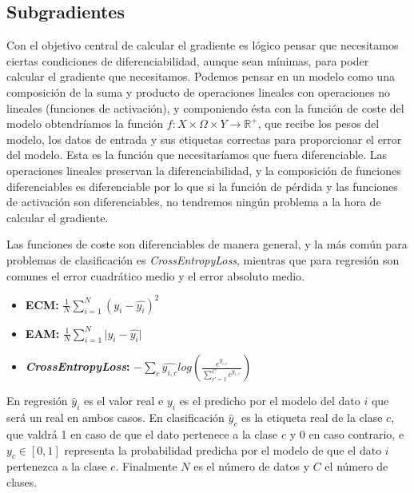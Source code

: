\subsection{Subgradientes} \label{sec:subgrad}

Con el objetivo central de calcular el gradiente es lógico pensar que necesitamos ciertas condiciones de diferenciabilidad, aunque sean mínimas, para poder calcular el gradiente que necesitamos. Podemos pensar en un modelo como una composición de la suma y producto de operaciones lineales con operaciones no lineales (funciones de activación), y componiendo ésta con la función de coste del modelo obtendríamos la función $f: X \times \Omega \times Y \rightarrow \mathbb{R^+}$, que recibe los pesos del modelo, los datos de entrada y sus etiquetas correctas para proporcionar el error del modelo. Esta es la función que necesitaríamos que fuera diferenciable. Las operaciones lineales preservan la diferenciabilidad, y la composición de funciones diferenciables es diferenciable por lo que si la función de pérdida y las funciones de activación son diferenciables, no tendremos ningún problema a la hora de calcular el gradiente.

Las funciones de coste son diferenciables de manera general, y la más común para problemas de clasificación es \textit{CrossEntropyLoss}, mientras que para regresión son comunes el error cuadrático medio y el error absoluto medio.

\begin{itemize}

    \item \textbf{ECM:} $\frac{1}{N} \sum_{i=1}^N \left (y_i - \hat{y_i} \right ) ^2$ 

    \item \textbf{EAM:} $\frac{1}{N} \sum_{i=1}^N \lvert y_i - \hat{y_i} \rvert$ 	

    \item \textbf{\textit{CrossEntropyLoss}:} $  - \sum_c \hat{y_{i,c}} log(\frac{e^{y_{i,c}}}{\sum_{c'=1}^C e^{y_{i,c'}}})$
\end{itemize}

En regresión $\hat{y}_i$ es el valor real  e $y_i$ es el predicho por el modelo del dato $i$ que será un real en ambos casos. En clasificación $\hat{y}_{c}$ es la etiqueta real de la clase $c$, que valdrá 1 en caso de que el dato pertenece a la clase $c$ y 0 en caso contrario, e $y_c \in [0,1]$ representa la probabilidad predicha por el modelo de que el dato $i$ pertenezca a la clase $c$. Finalmente $N$ es el número de datos y $C$ el número de clases. 


